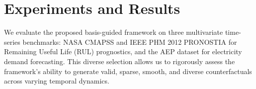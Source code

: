 \documentclass[runningheads]{llncs}
\begin{document}
	
	
	\section{Experiments and Results}
	We evaluate the proposed basis-guided framework on three multivariate time-series benchmarks: NASA CMAPSS and IEEE PHM 2012 PRONOSTIA for Remaining Useful Life (RUL) prognostics, and the AEP dataset for electricity demand forecasting. This diverse selection allows us to rigorously assess the framework's ability to generate valid, sparse, smooth, and diverse counterfactuals across varying temporal dynamics.
	
\end{document}
